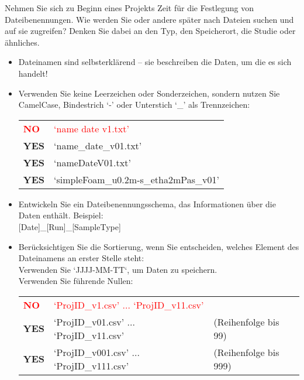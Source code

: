 Nehmen Sie sich zu Beginn eines Projekts Zeit für die Festlegung von
Dateibenennungen. Wie werden Sie oder andere später nach Dateien suchen und auf
sie zugreifen? Denken Sie dabei an den Typ, den Speicherort, die Studie oder
ähnliches.
\begin{itemize}
  \item Dateinamen sind selbsterklärend – sie beschreiben die Daten,
        um die es sich handelt!
  \item Verwenden Sie keine Leerzeichen oder Sonderzeichen, sondern nutzen Sie
        CamelCase, Bindestrich ‘-’ oder Unterstich ‘\_’ als Trennzeichen: \\
        \begin{tabular}{ll}
          \textcolor{red}{\textbf{NO}}  & \textcolor{red}{‘name date v1.txt’} \\
          \textbf{YES} & ‘name\_date\_v01.txt’ \\
          \textbf{YES} & ‘nameDateV01.txt’ \\
          \textbf{YES} & ‘simpleFoam\_u0.2m-s\_etha2mPas\_v01’ \\
        \end{tabular}
  \item Entwickeln Sie ein Dateibenennungsschema, das Informationen über die
        Daten enthält. Beispiel: \\
        {[Date]}\_{[Run]}\_{[SampleType]}
  \item Berücksichtigen Sie die Sortierung, wenn Sie entscheiden, welches
        Element des Dateinamens an erster Stelle steht: \\
        Verwenden Sie ‘JJJJ-MM-TT‘, um Daten zu speichern. \\
        Verwenden Sie führende Nullen: \\
        \begin{tabular}{lll}
          \textcolor{red}{\textbf{NO}}  & \textcolor{red}{‘ProjID\_v1.csv’  	...  	‘ProjID\_v11.csv’} & \\
          \textbf{YES} & ‘ProjID\_v01.csv’ 	... 	‘ProjID\_v11.csv’
             & (Reihenfolge bis 99) \\
          \textbf{YES} & ‘ProjID\_v001.csv’ 	...	‘ProjID\_v111.csv’
             & (Reihenfolge bis 999) \\
        \end{tabular}
\end{itemize}

